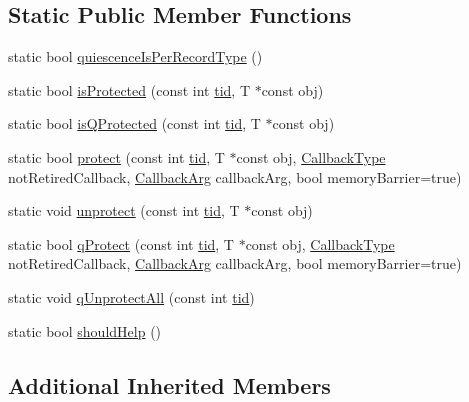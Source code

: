 \subsection*{Static Public Member Functions}
\begin{DoxyCompactItemize}
\item 
static bool \hyperlink{classreclaimer__rcu_a6dc43b3dbe423012ae7ccea223a820c7}{quiescence\+Is\+Per\+Record\+Type} ()
\item 
static bool \hyperlink{classreclaimer__rcu_a8b63d95c4391b2ee2f36c74a2141d078}{is\+Protected} (const int \hyperlink{microbench_2main_8cpp_a9ca9869868fe7e7a38a921cc7de4103f}{tid}, T $\ast$const obj)
\item 
static bool \hyperlink{classreclaimer__rcu_a64723a698dde603065e5e1c67761d15c}{is\+Q\+Protected} (const int \hyperlink{microbench_2main_8cpp_a9ca9869868fe7e7a38a921cc7de4103f}{tid}, T $\ast$const obj)
\item 
static bool \hyperlink{classreclaimer__rcu_aef0461a44efcde0d9253fa4bd9ea5f5f}{protect} (const int \hyperlink{microbench_2main_8cpp_a9ca9869868fe7e7a38a921cc7de4103f}{tid}, T $\ast$const obj, \hyperlink{globals_8h_a57f5c0d40b156d7d996492fb2f16e3cd}{Callback\+Type} not\+Retired\+Callback, \hyperlink{globals_8h_a3de64ef48066ac6430631c8b81a15345}{Callback\+Arg} callback\+Arg, bool memory\+Barrier=true)
\item 
static void \hyperlink{classreclaimer__rcu_aa786ea177bb54fcfd771b25b1b2ced9e}{unprotect} (const int \hyperlink{microbench_2main_8cpp_a9ca9869868fe7e7a38a921cc7de4103f}{tid}, T $\ast$const obj)
\item 
static bool \hyperlink{classreclaimer__rcu_ac1bb65eb5a5ebcc433094e72fa872b0c}{q\+Protect} (const int \hyperlink{microbench_2main_8cpp_a9ca9869868fe7e7a38a921cc7de4103f}{tid}, T $\ast$const obj, \hyperlink{globals_8h_a57f5c0d40b156d7d996492fb2f16e3cd}{Callback\+Type} not\+Retired\+Callback, \hyperlink{globals_8h_a3de64ef48066ac6430631c8b81a15345}{Callback\+Arg} callback\+Arg, bool memory\+Barrier=true)
\item 
static void \hyperlink{classreclaimer__rcu_a27f67a0be3fad8a808e397ad1ffd73e6}{q\+Unprotect\+All} (const int \hyperlink{microbench_2main_8cpp_a9ca9869868fe7e7a38a921cc7de4103f}{tid})
\item 
static bool \hyperlink{classreclaimer__rcu_a524af2f160524a0d662b1ffd29730d35}{should\+Help} ()
\end{DoxyCompactItemize}
\subsection*{Additional Inherited Members}


